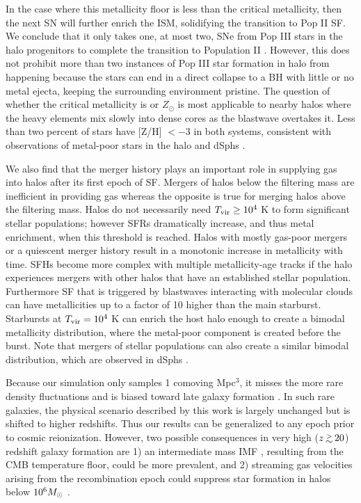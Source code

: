 \documentclass[12pt,preprint]{aastex}
\begin{document}
In the case where this metallicity floor is less than the critical
metallicity, then the next SN will further enrich the ISM, solidifying
the transition to Pop II SF.  We conclude that it only takes one, at
most two, SNe from Pop III stars in the halo progenitors to complete
the transition to Population II \citep{Frebel10}.  However, this does
not prohibit more than two instances of Pop III star formation in halo
from happening because the stars can end in a direct collapse to a BH
with little or no metal ejecta, keeping the surrounding environment
pristine.  The question of whether the critical metallicity is
 or  $Z_\odot$ is most applicable to nearby
halos where the heavy elements mix slowly into dense cores as the
blastwave overtakes it.  Less than two percent of stars have [Z/H] $<
-3$ in both systems, consistent with observations of metal-poor stars
in the halo and dSphs \citep{Beers05, Battaglia11}.

We also find that the merger history plays an important role in
supplying gas into halos after its first epoch of SF.  Mergers of
halos below the filtering mass are inefficient in providing gas
whereas the opposite is true for merging halos above the filtering
mass.  Halos do not necessarily need $\tvir \ge 10^4$ K to form
significant stellar populations; however SFRs dramatically increase,
and thus metal enrichment, when this threshold is reached.  Halos with
mostly gas-poor mergers or a quiescent merger history result in a
monotonic increase in metallicity with time.  SFHs become more complex
with multiple metallicity-age tracks if the halo experiences mergers
with other halos that have an established stellar population.
Furthermore SF that is triggered by blastwaves interacting with
molecular clouds can have metallicities up to a factor of 10 higher
than the main starburst.  Starbursts at $\tvir = 10^4$ K can enrich
the host halo enough to create a bimodal metallicity distribution,
where the metal-poor component is created before the burst.  Note that
mergers of stellar populations can also create a similar bimodal
distribution, which are observed in dSphs \citep{Battaglia11}.

Because our simulation only samples 1 comoving Mpc$^3$, it misses the
more rare density fluctuations and is biased toward late galaxy
formation \citep{Barkana04}.  In such rare galaxies, the physical
scenario described by this work is largely unchanged but is shifted to
higher redshifts.  Thus our results can be generalized to any epoch
prior to cosmic reionization.  However, two possible consequences in
very high ($z \gsim 20$) redshift galaxy formation are 1) an
intermediate mass IMF \citep{Larson98, Tumlinson07_IMF,
  2009ApJ...691..441S}, resulting from the CMB temperature floor,
could be more prevalent, and 2) streaming gas velocities arising from
the recombination epoch \citep{Tselia10} could suppress star formation
in halos below $10^6 \Ms$ \citep{Tselia10_Minihalo, Greif11_Delay}.
\end{document}
